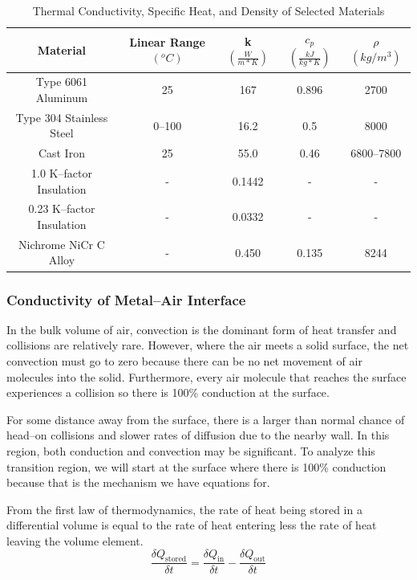 \documentclass[10pt, twocolumn]{article}
\begin{document}
\begin{table}
\centering
\caption{Thermal Conductivity, Specific Heat, and Density of Selected Materials}
\begin{tabular}{c | c | c | c | c}
\hline\hline
Material	&Linear Range $(^{o}C)$	&k \(\left(\frac{W}{m*K}\right)\)	&\(c_{p}\) \(\left(\frac{kJ}{kg*K}\right)\)	&\(\rho\) \((kg/m^{3})\)	\\
\hline
Type 6061 Aluminum		&25	&167	&0.896	&2700	\\
Type 304 Stainless Steel	&0--100	&16.2	&0.5	&8000	\\
Cast Iron			&25	&55.0	&0.46	&6800--7800	\\
1.0 K--factor Insulation	&-	&0.1442	&-	&-	\\
0.23 K--factor Insulation	&-	&0.0332	&-	&-	\\
Nichrome NiCr C Alloy		&-	&0.450	&0.135	&8244	\\
\hline\hline
\end{tabular}
\label{thermal-properties-table}
\end{table}

\subsubsection*{Conductivity of Metal--Air Interface}

In the bulk volume of air, convection is the dominant form of heat
transfer and collisions are relatively rare. However, where the
air meets a solid surface, the net convection must go to zero because
there can be no net movement of air molecules into the solid.
Furthermore, every air molecule that reaches the surface experiences
a collision so there is 100\% conduction at the surface.

For some distance away from the surface, there is a larger than
normal chance of head--on collisions and slower rates of diffusion
due to the nearby wall. In this region, both conduction and convection
may be significant. To analyze this transition region,
we will start at the surface where there is 100\% conduction
because that is the mechanism we have equations for.

From the first law of thermodynamics, the rate of heat being stored
in a differential volume is equal to the rate of heat entering less
the rate of heat leaving the volume element.
\begin{equation*}
\frac{\delta Q_{\textrm{stored}}}{\delta t}=
\frac{\delta Q_{\textrm{in}}}{\delta t}-
\frac{\delta Q_{\textrm{out}}}{\delta t}
\end{equation*}
\end{document}
